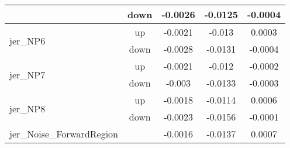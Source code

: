 \begin{table}[h!]
\begin{tabular}{lcccc}
                                       & down &     -0.0026     &     -0.0125     &     -0.0004       \\ \hline
\multirow{2}{*}{jer\_NP6}      & up   &     -0.0021     &     -0.013     &     0.0003      \\
                                       & down &     -0.0028     &     -0.0131     &     -0.0004       \\ \hline
\multirow{2}{*}{jer\_NP7}      & up   &     -0.0021     &     -0.012     &     -0.0002      \\
                                       & down &     -0.003     &     -0.0133     &     -0.0003       \\ \hline
\multirow{2}{*}{jer\_NP8}      & up   &     -0.0018     &     -0.0114     &     0.0006      \\
                                       & down &     -0.0023     &     -0.0156     &     -0.0001       \\ \hline
\multirow{2}{*}{jer\_Noise\_ForwardRegion}  &  & \multirow{2}{*}{-0.0016} & \multirow{2}{*}{-0.0137}  & \multirow{2}{*}{0.0007}  \\  \\ \hline
\end{tabular}

\label{tab:systUnc_lep_fl}
\end{table}


